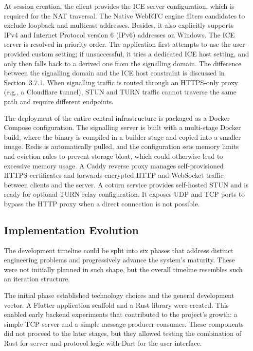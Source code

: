 \documentclass[12pt,a4paper,oneside]{report}
\begin{document}
At session creation, the client provides the ICE server configuration, which is required for the NAT traversal. The Native WebRTC engine filters candidates to exclude loopback and multicast addresses. Besides, it also explicitly supports IPv4 and Internet Protocol version 6 (IPv6) addresses on Windows. The ICE server is resolved in priority order. The application first attempts to use the user-provided custom setting; if unsuccessful, it tries a dedicated ICE host setting, and only then falls back to a derived one from the signalling domain. The difference between the signalling domain and the ICE host constraint is discussed in Section~3.7.1. When signalling traffic is routed through an HTTPS-only proxy (e.g., a Cloudflare tunnel), STUN and TURN traffic cannot traverse the same path and require different endpoints.

The deployment of the entire central infrastructure is packaged as a Docker Compose configuration. The signalling server is built with a multi-stage Docker build, where the binary is compiled in a builder stage and copied into a smaller image. Redis is automatically pulled, and the configuration sets memory limits and eviction rules to prevent storage bloat, which could otherwise lead to excessive memory usage. A Caddy reverse proxy manages self-provisioned HTTPS certificates and forwards encrypted HTTP and WebSocket traffic between clients and the server. A coturn service provides self-hosted STUN and is ready for optional TURN relay configuration. It exposes UDP and TCP ports to bypass the HTTP proxy when a direct connection is not possible.


\subsection{Implementation Evolution}
\label{sec:impl-evolution}

The development timeline could be split into six phases that address distinct engineering problems and progressively advance the system's maturity. These were not initially planned in such shape, but the overall timeline resembles such an iteration structure.

The initial phase established technology choices and the general development vector. A Flutter application scaffold and a Rust library were created. This enabled early backend experiments that contributed to the project's growth: a simple TCP server and a simple message producer-consumer. These components did not proceed to the later stages, but they allowed testing the combination of Rust for server and protocol logic with Dart for the user interface.
\end{document}
